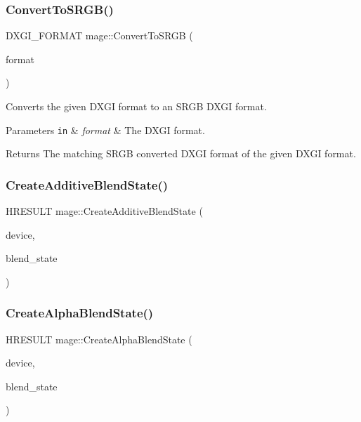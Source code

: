 \subsubsection{\texorpdfstring{Convert\+To\+S\+R\+G\+B()}{ConvertToSRGB()}}
{\footnotesize\ttfamily D\+X\+G\+I\+\_\+\+F\+O\+R\+M\+AT mage\+::\+Convert\+To\+S\+R\+GB (\begin{DoxyParamCaption}\item[{D\+X\+G\+I\+\_\+\+F\+O\+R\+M\+AT}]{format }\end{DoxyParamCaption})\hspace{0.3cm}{\ttfamily [noexcept]}}

Converts the given D\+X\+GI format to an S\+R\+GB D\+X\+GI format.


\begin{DoxyParams}[1]{Parameters}
\mbox{\tt in}  & {\em format} & The D\+X\+GI format. \\
\hline
\end{DoxyParams}
\begin{DoxyReturn}{Returns}
The matching S\+R\+GB converted D\+X\+GI format of the given D\+X\+GI format. 
\end{DoxyReturn}
\hypertarget{namespacemage_a5c813464cd190784dec2d505d3254917}{}\label{namespacemage_a5c813464cd190784dec2d505d3254917} 
\subsubsection{\texorpdfstring{Create\+Additive\+Blend\+State()}{CreateAdditiveBlendState()}}
{\footnotesize\ttfamily H\+R\+E\+S\+U\+LT mage\+::\+Create\+Additive\+Blend\+State (\begin{DoxyParamCaption}\item[{I\+D3\+D11\+Device2 $\ast$}]{device,  }\item[{I\+D3\+D11\+Blend\+State $\ast$$\ast$}]{blend\+\_\+state }\end{DoxyParamCaption})}

\hypertarget{namespacemage_a334c4403848e086f84b328883ff387cc}{}\label{namespacemage_a334c4403848e086f84b328883ff387cc} 
\subsubsection{\texorpdfstring{Create\+Alpha\+Blend\+State()}{CreateAlphaBlendState()}}
{\footnotesize\ttfamily H\+R\+E\+S\+U\+LT mage\+::\+Create\+Alpha\+Blend\+State (\begin{DoxyParamCaption}\item[{I\+D3\+D11\+Device2 $\ast$}]{device,  }\item[{I\+D3\+D11\+Blend\+State $\ast$$\ast$}]{blend\+\_\+state }\end{DoxyParamCaption})}

